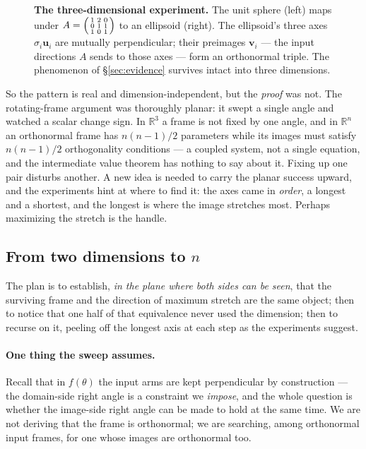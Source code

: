 \documentclass[11pt]{article}
\numberwithin{equation}{section}
\newcommand{\R}{\mathbb{R}}
\newcommand{\vv}[1]{\mathbf{v}_{#1}}
\newcommand{\uu}[1]{\mathbf{u}_{#1}}
\theoremstyle{plainish}
\begin{document}
\begin{figure}[htbp]
\centering

\caption{\textbf{The three-dimensional experiment.} The unit sphere (left) maps
under $A = \left(\protect\begin{smallmatrix} 1 & 2 & 0 \\ 0 & 1 & 1 \\ 1 & 0 & 1\protect\end{smallmatrix}\right)$
to an ellipsoid (right). The ellipsoid's three axes $\sigma_i\uu i$ are mutually
perpendicular; their preimages $\vv i$ --- the input directions $A$ sends to
those axes --- form an orthonormal triple. The phenomenon of \S\ref{sec:evidence}
survives intact into three dimensions.}
\label{fig:threed}
\end{figure}

So the pattern is real and dimension-independent, but the \emph{proof} was not.
The rotating-frame argument was thoroughly planar: it swept a single angle and
watched a scalar change sign. In $\R^3$ a frame is not fixed by one angle, and
in $\R^n$ an orthonormal frame has $n(n-1)/2$ parameters while its images must
satisfy $n(n-1)/2$ orthogonality conditions --- a coupled system, not a single
equation, and the intermediate value theorem has nothing to say about it. Fixing
up one pair disturbs another. A new idea is needed to carry the planar success
upward, and the experiments hint at where to find it: the axes came in
\emph{order}, a longest and a shortest, and the longest is where the image
stretches most. Perhaps maximizing the stretch is the handle.

\subsection{From two dimensions to \texorpdfstring{$n$}{n}}
\label{sec:variational}

The plan is to establish, \emph{in the plane where both sides can be seen}, that
the surviving frame and the direction of maximum stretch are the same object;
then to notice that one half of that equivalence never used the dimension; then
to recurse on it, peeling off the longest axis at each step as the experiments
suggest.

\paragraph{One thing the sweep assumes.} Recall that in $f(\theta)$ the input
arms are kept perpendicular by construction --- the domain-side right angle is a
constraint we \emph{impose}, and the whole question is whether the image-side
right angle can be made to hold at the same time. We are not deriving that the
frame is orthonormal; we are searching, among orthonormal input frames, for one
whose images are orthonormal too.
\end{document}

